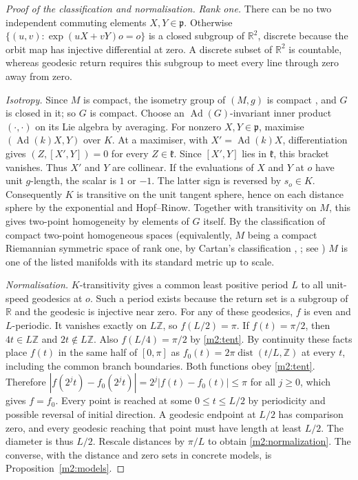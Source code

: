 \documentclass[11pt,reqno]{amsart}
\theoremstyle{definition}
\theoremstyle{remark}
\numberwithin{equation}{section}
\newcommand{\R}{\mathbb{R}}
\newcommand{\Z}{\mathbb{Z}}
\newcommand{\Ad}{\operatorname{Ad}}
\begin{document}
\begin{proof}[Proof of the classification and normalisation]
\emph{Rank one.}  There can be no two independent commuting elements $X,Y\in\mathfrak p$.  Otherwise $\{(u,v):\exp(uX+vY)o=o\}$ is a
closed subgroup of $\R^2$, discrete because the orbit map has injective differential at zero.  A discrete subset of $\R^2$ is countable,
whereas geodesic return requires this subgroup to meet every line through zero away from zero.

\emph{Isotropy.}  Since $M$ is compact, the isometry group of $(M,g)$ is compact \cite{m2:MyersSteenrod}, and $G$ is closed in it; so $G$
is compact.  Choose an $\Ad(G)$-invariant inner product $(\cdot,\cdot)$ on its Lie algebra by averaging.  For nonzero $X,Y\in\mathfrak p$,
maximise $(\Ad(k)X,Y)$ over $K$.  At a maximiser, with $X'=\Ad(k)X$, differentiation gives $(Z,[X',Y])=0$ for every $Z\in\mathfrak k$.
Since $[X',Y]$ lies in $\mathfrak k$, this bracket vanishes.  Thus $X'$ and $Y$ are collinear.  If the evaluations of $X$ and $Y$ at $o$
have unit $g$-length, the scalar is $1$ or $-1$.  The latter sign is reversed by $s_o\in K$.  Consequently $K$ is transitive on the unit
tangent sphere, hence on each distance sphere by the exponential and Hopf--Rinow.  Together with transitivity on $M$, this gives two-point
homogeneity by elements of $G$ itself.  By the classification of compact two-point homogeneous spaces \cite{Wang52} (equivalently,
$M$ being a compact Riemannian symmetric space of rank one, by Cartan's classification \cite{Cartan26,Cartan27}, \cite[Ch.~X]{Helgason};
see \cite[Ch.~3]{Besse78}) $M$ is one of the listed manifolds with its standard metric up to scale.

\emph{Normalisation.}  $K$-transitivity gives a common least positive period $L$ to all unit-speed geodesics at $o$.  Such a period exists
because the return set is a subgroup of $\R$ and the geodesic is injective near zero.  For any of these geodesics, $f$ is even and
$L$-periodic.  It vanishes exactly on $L\Z$, so $f(L/2)=\pi$.  If $f(t)=\pi/2$, then $4t\in L\Z$ and $2t\notin L\Z$.  Also
$f(L/4)=\pi/2$ by \eqref{m2:tent}.  By continuity these facts place $f(t)$ in the same half of $[0,\pi]$ as
$f_0(t)=2\pi\operatorname{dist}(t/L,\Z)$ at every $t$, including the common branch boundaries.  Both functions obey \eqref{m2:tent}.
Therefore $|f(2^jt)-f_0(2^jt)|=2^j|f(t)-f_0(t)|\le\pi$ for all $j\ge0$, which gives $f=f_0$.  Every point is reached at some
$0\le t\le L/2$ by periodicity and possible reversal of initial direction.  A geodesic endpoint at $L/2$ has comparison zero, and every
geodesic reaching that point must have length at least $L/2$.  The diameter is thus $L/2$.  Rescale distances by $\pi/L$ to obtain
\eqref{m2:normalization}.  The converse, with the distance and zero sets in concrete models, is Proposition~\ref{m2:models}.
\end{proof}
\end{document}
